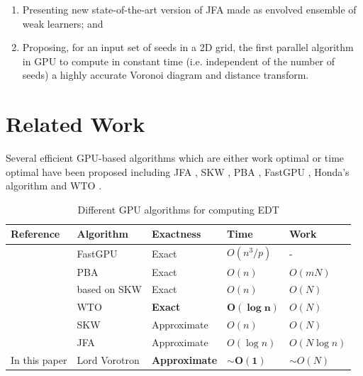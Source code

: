 \documentclass{article}
\newcommand{\citep}[1]{\citeauthor*{#1} \cite{#1}} %
\newcommand{\ourjfa}{Lord Vorotron} %
\begin{document}
\begin{enumerate}
\item Presenting new state-of-the-art version of JFA made as envolved ensemble of weak learners; and
\item Proposing, for an input set of seeds in a 2D grid, the first
parallel algorithm in GPU to compute in constant time (i.e.
independent of the number of seeds) a highly accurate
Voronoi diagram and distance transform.
\end{enumerate}

\section{Related Work} %

Several efficient GPU-based algorithms which are either
work optimal or time optimal have been proposed including
JFA \cite{rong2006jump}, SKW \cite{schneider2009gpu},
PBA \cite{cao2010parallel}, FastGPU \cite{de2017fast}, Honda's algorithm \cite{honda2017simple} and
WTO \cite{manduhu2019work}.

\begin{table}[H] \centering
\begin{tabular}{@{}lllll@{}}
\toprule
Reference                & Algorithm    & Exactness   & Time         & Work         \\ \midrule
\citep{de2017fast}       & FastGPU      & Exact       & $O(n^3/p)$   & -            \\
\citep{cao2010parallel}  & PBA          & Exact       & $O(n)$       & $O(mN)$      \\
\citep{honda2017simple}  & based on SKW & Exact       & $O(n)$       & $O(N)$       \\
\citep{manduhu2019work}  & WTO          & \cellcolor{blue!25}\textbf{Exact}& \cellcolor{blue!25}$\bm{O(\log n)}$  & $O(N)$       \\
\citep{schneider2009gpu} & SKW          & Approximate & $O(n)$       & $O(N)$       \\
\citep{rong2006jump}     & JFA          & Approximate & $O(\log n)$  & $O(N\log n)$ \\ \bottomrule
In this paper            & \ourjfa      & \cellcolor{blue!25}\textbf{Approximate} & \cellcolor{blue!25}$\sim$$\bm{O(1)}$ & $\sim$$O(N)$ \\ \bottomrule
\end{tabular}
\vspace{1em}
\caption{Different GPU algorithms for computing EDT}
\end{table}
\end{document}
